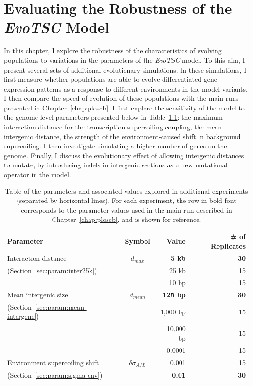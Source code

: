 \chapter{Evaluating the Robustness of the \emph{EvoTSC} Model}
\label{chap:param}

In this chapter, I explore the robustness of the characteristics of evolving populations to variations in the parameters of the \emph{EvoTSC} model.
To this aim, I present several sets of additional evolutionary simulations.
In these simulations, I first measure whether populations are able to evolve differentiated gene expression patterns as a response to different environments in the model variants.
I then compare the speed of evolution of these populations with  the main runs presented in Chapter~\ref{chap:ploscb}.
I first explore the sensitivity of the model to the genome-level parameters presented below in Table~\ref{tab:param:params}: the maximum interaction distance for the transcription-supercoiling coupling, the mean intergenic distance, the strength of the environment-caused shift in background supercoiling.
I then investigate simulating a higher number of genes on the genome.
Finally, I discuss the evolutionary effect of allowing intergenic distances to mutate, by introducing indels in intergenic sections as a new mutational operator in the model.

\begin{table}[H]
\begin{center}
\begin{tabular}{l c r r}
\toprule
\textbf{Parameter} & \textbf{Symbol} & \textbf{Value} & \textbf{\# of Replicates} \\
\midrule
Interaction distance & $d_{max}$ & \textbf{5 kb} & \textbf{30}\\
(Section~\ref{sec:param:inter25k}) & & 25 kb & 15\\
\midrule
& & 10 bp& 15\\
Mean intergenic size & $d_{mean}$ & \textbf{125 bp} & \textbf{30} \\
(Section~\ref{sec:param:mean-intergene})& & 1,000 bp & 15\\
& & 10,000 bp & 15 \\
\midrule
& & 0.0001 & 15\\
Environment supercoiling shift & $\delta\sigma_{A/B}$ & 0.001 & 15\\
(Section~\ref{sec:param:sigma-env})& & \textbf{0.01} & \textbf{30}\\
\bottomrule
\end{tabular}
\end{center}
\caption[Table of parameter values explored in additional \emph{EvoTSC} simulations]{Table of the parameters and associated values explored in additional experiments (separated by horizontal lines).
For each experiment, the row in bold font corresponds to the parameter values used in the main run described in Chapter~\ref{chap:ploscb}, and is shown for reference.}
\label{tab:param:params}
\end{table}

